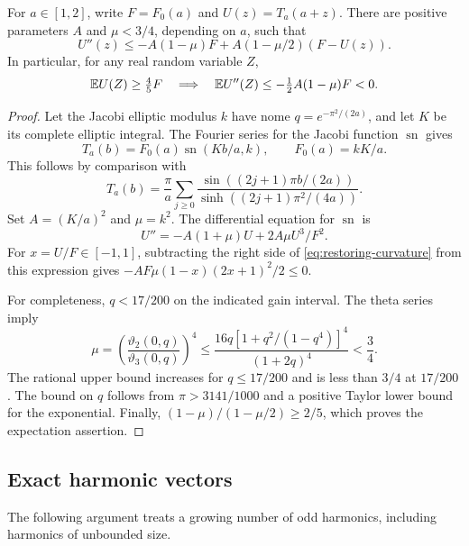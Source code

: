 \begin{lemma}
\label{lem:periodic-curvature}
For $a\in[1,2]$, write $F=F_0(a)$ and $U(z)=T_a(a+z)$.
There are positive parameters $A$ and $\mu<3/4$, depending on $a$,
such that
\begin{equation}\label{eq:restoring-curvature}
 U''(z)\le-A(1-\mu)F+A(1-\mu/2)(F-U(z)).
\end{equation}
In particular, for any real random variable $Z$,
\[
 \mathbb E U(Z)\ge\tfrac45F
 \quad\Longrightarrow\quad
 \mathbb E U''(Z)\le-\tfrac12 A(1-\mu)F<0.
\]
\end{lemma}
\begin{proof}
Let the Jacobi elliptic modulus $k$ have nome
$q=e^{-\pi^2/(2a)}$, and let $K$ be its complete elliptic integral.
The Fourier series for the Jacobi function $\operatorname{sn}$ gives
\[
 T_a(b)=F_0(a)\operatorname{sn}(Kb/a,k),\qquad F_0(a)=kK/a.
\]
This follows by comparison with
\[
 T_a(b)=\frac\pi a\sum_{j\ge0}
 \frac{\sin((2j+1)\pi b/(2a))}
 {\sinh((2j+1)\pi^2/(4a))}.
\]
Set $A=(K/a)^2$ and $\mu=k^2$. The differential equation for
$\operatorname{sn}$ is
\[
 U''=-A(1+\mu)U+2A\mu U^3/F^2.
\]
For $x=U/F\in[-1,1]$, subtracting the right side of
\eqref{eq:restoring-curvature} from this expression gives
$-AF\mu(1-x)(2x+1)^2/2\le0$.

For completeness, $q<17/200$ on the indicated gain interval. The theta
series imply
\[
 \mu=\left(\frac{\vartheta_2(0,q)}{\vartheta_3(0,q)}\right)^4
 \le\frac{16q[1+q^2/(1-q^4)]^4}{(1+2q)^4}<\frac34.
\]
The rational upper bound increases for $q\le17/200$ and is less than
$3/4$ at $17/200$. The bound on $q$ follows from
$\pi>3141/1000$ and a positive Taylor lower bound for the exponential.
Finally,
$(1-\mu)/(1-\mu/2)\ge2/5$, which proves the expectation assertion.
\end{proof}

\subsection{Exact harmonic vectors}

The following argument treats a growing number of odd harmonics,
including harmonics of unbounded size.

